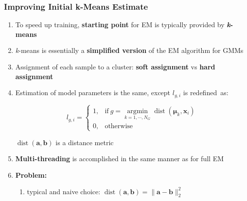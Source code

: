 \documentclass[usenames,dvipsnames]{beamer}
\DeclareMathOperator*{\argmin}{argmin}
\def\Vec#1{{\boldsymbol{#1}}}
\begin{document}
\begin{frame}
\frametitle{Improving Initial k-Means Estimate}

\begin{enumerate}[{~~$\boldsymbol{\bullet}$}]

\item
To speed up training, {\bf starting point} for EM is typically provided by \textbf{\textit{k}-means}
\vspace{0.5ex}

\item
{\it k}-means is essentially a {\bf simplified version} of the EM algorithm for GMMs
\vspace{0.5ex}

\item
Assignment of each sample to a cluster: {\bf soft assignment} vs {\bf hard assignment}
\vspace{0.5ex}

\item
Estimation of model parameters is the same, except $l_{g,i}$ is redefined~as:%

\vspace{-1.5ex}
\begin{minipage}{1\textwidth}
\begin{minipage}{0.5\textwidth}
\begin{equation*}
  l_{g,i} = \left\{
  \begin{array}{ll}
  1, & \mbox{if} ~ g = \argmin\limits_{k=1, \cdots, N_G} \operatorname{dist}(\Vec{\mu}_k, \Vec{x}_i) \\
  0, & \mbox{otherwise}
  \end{array}
  \right.
\end{equation*}%
\end{minipage}
\begin{minipage}{0.5\textwidth}
{$\operatorname{dist}(\Vec{a}, \Vec{b})$} is a distance metric
\end{minipage}
\end{minipage}
\vspace{0.5ex}


\item 
{\bf Multi-threading} is accomplished in the same manner as for full EM
\vspace{0.5ex}

\item
{\bf Problem:}
\begin{enumerate}[{$\boldsymbol{\rightarrow}$}]
\renewcommand{\itemsep}{0.9ex}

\item
typical and naive choice:  $\operatorname{dist}(\Vec{a}, \Vec{b}) = \| \Vec{a} - \Vec{b} \|^{2}_{2}$


\end{enumerate}
\end{enumerate}
\end{frame}
\end{document}
